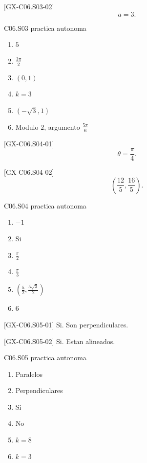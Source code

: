 \begin{shortanswer}{[GX-C06.S03-02]}
\[
a=3.
\]
\end{shortanswer}

\begin{shortanswer}{C06.S03 practica autonoma}
\begin{enumerate}[label=\textbf{PX-C06.S03-\arabic*:}, leftmargin=*]
  \item \(5\)
  \item \(\frac{3\pi}{2}\)
  \item \((0,1)\)
  \item \(k=3\)
  \item \((-\sqrt{3},1)\)
  \item Modulo \(2\), argumento \(\frac{5\pi}{6}\)
\end{enumerate}
\end{shortanswer}

\begin{shortanswer}{[GX-C06.S04-01]}
\[
\theta=\frac{\pi}{4}.
\]
\end{shortanswer}

\begin{shortanswer}{[GX-C06.S04-02]}
\[
\left(\frac{12}{5},\frac{16}{5}\right).
\]
\end{shortanswer}

\begin{shortanswer}{C06.S04 practica autonoma}
\begin{enumerate}[label=\textbf{PX-C06.S04-\arabic*:}, leftmargin=*]
  \item \(-1\)
  \item Si
  \item \(\frac{\pi}{2}\)
  \item \(\frac{\pi}{3}\)
  \item \(\left(\frac{5}{2},\frac{5\sqrt{3}}{2}\right)\)
  \item \(6\)
\end{enumerate}
\end{shortanswer}

\begin{shortanswer}{[GX-C06.S05-01]}
Si. Son perpendiculares.
\end{shortanswer}

\begin{shortanswer}{[GX-C06.S05-02]}
Si. Estan alineados.
\end{shortanswer}

\begin{shortanswer}{C06.S05 practica autonoma}
\begin{enumerate}[label=\textbf{PX-C06.S05-\arabic*:}, leftmargin=*]
  \item Paralelos
  \item Perpendiculares
  \item Si
  \item No
  \item \(k=8\)
  \item \(k=3\)
\end{enumerate}
\end{shortanswer}

